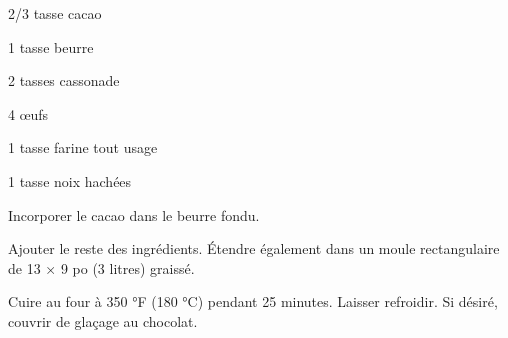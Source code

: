 %
%   
%   
%   
%




\totaltime{}


\begin{ingredients}
    \item 2/3 tasse cacao
    \item 1 tasse beurre
    \item 2 tasses cassonade
    \item 4 œufs
    \item 1 tasse farine tout usage
    \item 1 tasse noix hachées
\end{ingredients}

\begin{steps}
    \item Incorporer le cacao dans le beurre fondu.
    \item Ajouter le reste des ingrédients. Étendre également dans un moule rectangulaire de 13 × 9 po (3 litres) graissé.
    \item Cuire au four à 350 °F (180 °C) pendant 25 minutes. Laisser refroidir. Si désiré, couvrir de glaçage au chocolat.
\end{steps}
